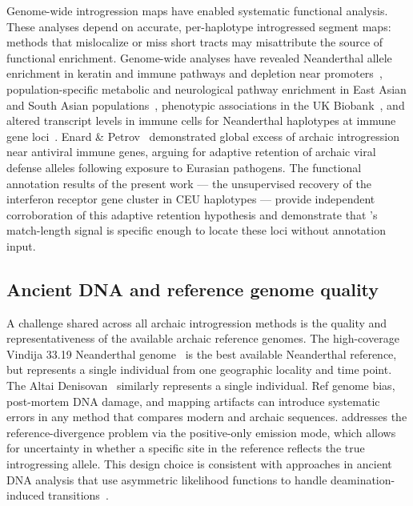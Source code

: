 Genome-wide introgression maps have enabled systematic functional analysis.
These analyses depend on accurate, per-haplotype introgressed segment maps:
methods that mislocalize or miss short tracts may misattribute the source
of functional enrichment.
Genome-wide analyses have revealed Neanderthal allele enrichment in keratin and
immune pathways and depletion near promoters~\citep{sankararaman2016combined},
population-specific metabolic and neurological pathway enrichment in East Asian
and South Asian populations~\citep{vernot2016excavating}, phenotypic associations
in the UK Biobank~\citep{dannemann2017contribution}, and altered transcript levels
in immune cells for Neanderthal haplotypes at immune
gene loci~\citep{mccoy2017impacts}.
Enard \& Petrov~\citeyear{enard2018human} demonstrated global excess of archaic
introgression near antiviral immune genes, arguing for adaptive retention of
archaic viral defense alleles following exposure to Eurasian pathogens.
The functional annotation results of the present work --- the unsupervised
recovery of the interferon receptor gene cluster in CEU haplotypes --- provide
independent corroboration of this adaptive retention hypothesis and demonstrate
that \AP{}'s match-length signal is specific enough to locate these loci
without annotation input.

\subsection*{Ancient DNA and reference genome quality}

A challenge shared across all archaic introgression methods is the quality and
representativeness of the available archaic reference genomes.
The high-coverage Vindija 33.19 Neanderthal
genome~\citep{prufer2014complete, prufer2017high} is the best available
Neanderthal reference, but represents a single individual from one
geographic locality and time point.
The Altai Denisovan~\citep{meyer2012high} similarly represents a single
individual.
Ref genome bias, post-mortem DNA damage, and mapping artifacts can introduce
systematic errors in any method that compares modern and archaic sequences.
\AP{} addresses the reference-divergence problem via the positive-only emission
mode, which allows for uncertainty in whether a specific site in the reference
reflects the true introgressing allele.
This design choice is consistent with approaches in ancient DNA analysis that
use asymmetric likelihood functions to handle deamination-induced
transitions~\citep{jonsson2013mapdamage}.
